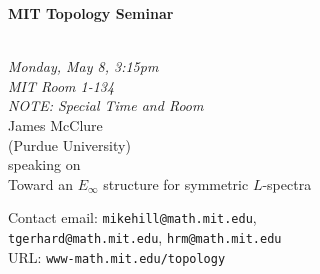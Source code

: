 \documentclass{slides}
\begin{document}
\begin{center}

{\fontsize {54pt}{40pt}\selectfont

\textrm{
{\textbf{MIT Topology Seminar}}}
}\\
\vspace{1cm}
{\large\textrm{\emph{Monday, May 8, 3:15pm\\MIT Room 1-134 \\NOTE: Special Time and Room}}}\\
\vspace{1cm}
\textrm{{\LARGE James McClure  \\[.5cm](Purdue University)}}\\
\vspace{1cm} %
\textrm{speaking on}\\ %
\vspace{5mm}
\textrm{{\LARGE  Toward an $E_\infty$ structure for symmetric $L$-spectra}}\\
\end{center}
\vspace{1cm}
{\small


\textrm{Contact email: } \texttt{mikehill@math.mit.edu}, \\
\texttt{tgerhard@math.mit.edu},
\texttt{hrm@math.mit.edu}\\
\textrm{URL: } \texttt{www-math.mit.edu/topology}
}
\end{document}
